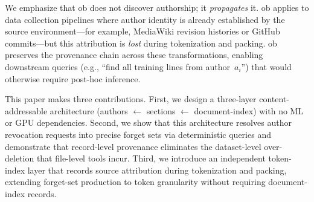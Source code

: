 We emphasize that ob does not discover authorship; it \emph{propagates} it. ob applies to data collection pipelines where author identity is already established by the source environment---for example, MediaWiki revision histories or GitHub commits---but this attribution is \emph{lost} during tokenization and packing. ob preserves the provenance chain across these transformations, enabling downstream queries (e.g., ``find all training lines from author~$a_i$'') that would otherwise require post-hoc inference.



This paper makes three contributions. First, we design a three-layer content-addressable architecture (authors $\leftarrow$ sections $\leftarrow$ document-index) with no ML or GPU dependencies. Second, we show that this architecture resolves author revocation requests into precise forget sets via deterministic queries and demonstrate that record-level provenance eliminates the dataset-level over-deletion that file-level tools incur. Third, we introduce an independent token-index layer that records source attribution during tokenization and packing, extending forget-set production to token granularity without requiring document-index records.
